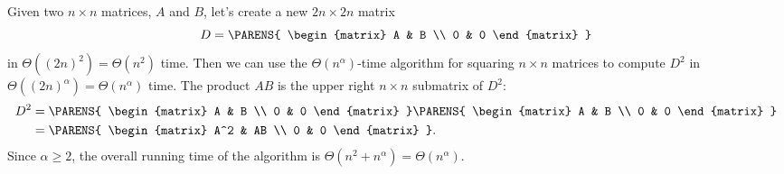 Given two $n\times n$ matrices, $A$ and $B$, let's create a new $2n\times2n$ matrix
\[
    D = \PARENS{
        \begin{matrix}
            A & B \\
            0 & 0
        \end{matrix}
    }
\]
in $\Theta((2n)^2)=\Theta(n^2)$ time.
Then we can use the $\Theta(n^\alpha)$-time algorithm for squaring $n\times n$ matrices to compute $D^2$ in $\Theta((2n)^\alpha)=\Theta(n^\alpha)$ time.
The product $AB$ is the upper right $n\times n$ submatrix of $D^2$:
\begin{align*}
    D^2 &= \PARENS{
        \begin{matrix}
            A & B \\
            0 & 0
        \end{matrix}
    }\PARENS{
        \begin{matrix}
            A & B \\
            0 & 0
        \end{matrix}
    } \\
    &= \PARENS{
        \begin{matrix}
            A^2 & AB \\
            0 & 0
        \end{matrix}
    }.
\end{align*}
Since $\alpha\ge2$, the overall running time of the algorithm is $\Theta(n^2+n^\alpha)=\Theta(n^\alpha)$.
